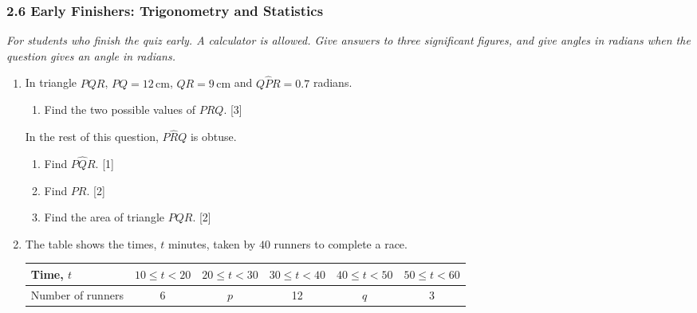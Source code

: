\documentclass[12pt, twoside]{article}
\begin{document}
\subsubsection*{2.6 Early Finishers: Trigonometry and Statistics}

\emph{For students who finish the quiz early. A calculator is allowed. Give
answers to three significant figures, and give angles in radians when the
question gives an angle in radians.}

\begin{enumerate}[itemsep=0.15cm]

\item[1.] [Maximum mark: 8]

In triangle $PQR$, $PQ = 12\,\text{cm}$, $QR = 9\,\text{cm}$ and
$Q\hat{P}R = 0.7$ radians.

\begin{enumerate}[itemsep=0.1cm]
  \item Find the two possible values of $P\hat{R}Q$. \hfill [3]
\end{enumerate}

In the rest of this question, $P\hat{R}Q$ is obtuse.

\begin{enumerate}[itemsep=0.1cm]
  \item[(b)] Find $P\hat{Q}R$. \hfill [1]
  \item[(c)] Find $PR$. \hfill [2]
  \item[(d)] Find the area of triangle $PQR$. \hfill [2]
\end{enumerate}


\newpage

\item[2.] [Maximum mark: 9]

The table shows the times, $t$ minutes, taken by $40$ runners to complete
a race.

\begin{center}
\setlength{\tabcolsep}{3.5pt}\renewcommand{\arraystretch}{1.2}
\begin{tabular}{|l|c|c|c|c|c|}
\hline
Time, $t$ & $10 \le t < 20$ & $20 \le t < 30$ & $30 \le t < 40$ & $40 \le t < 50$ & $50 \le t < 60$ \\
\hline
Number of runners & 6 & $p$ & 12 & $q$ & 3 \\
\hline
\end{tabular}
\end{center}


\end{enumerate}
\end{document}
